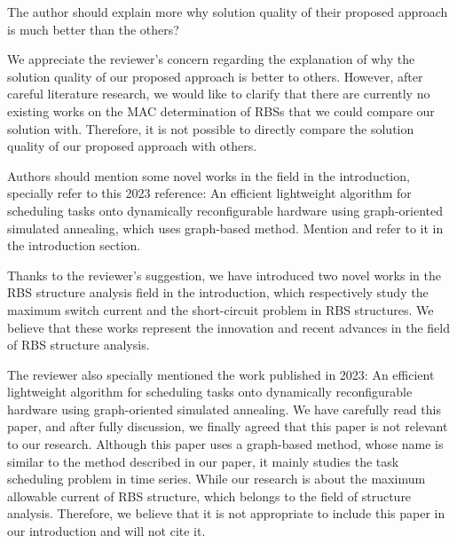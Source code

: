 \begin{revcomment}
  The author should explain more why solution quality of their proposed approach is much better than the others?
\end{revcomment}
\begin{revresponse}

We appreciate the reviewer's concern regarding the explanation of why the solution quality of our proposed approach is better to others. 
However, after careful literature research, we would like to clarify that there are currently no existing works on the MAC determination of RBSs that we could compare our solution with. 
Therefore, it is not possible to directly compare the solution quality of our proposed approach with others.
  
\end{revresponse}

\begin{revcomment}
  Authors should mention some novel works in the field in the introduction, specially refer to this 2023 reference: An efficient lightweight algorithm for scheduling tasks onto dynamically reconfigurable hardware using graph-oriented simulated annealing, which uses graph-based method. Mention and refer to it in the introduction section.
\end{revcomment}
\begin{revresponse}

Thanks to the reviewer's suggestion, we have introduced two novel works in the RBS structure analysis field in the introduction, which respectively study the maximum switch current \cite{han2021analysis} and the short-circuit problem \cite{chenSneakCircuitTheory2021} in RBS structures.
We believe that these works represent the innovation and recent advances in the field of RBS structure analysis.


The reviewer also specially mentioned the work published in 2023: An efficient lightweight algorithm for scheduling tasks onto dynamically reconfigurable hardware using graph-oriented simulated annealing.
We have carefully read this paper, and after fully discussion, we finally agreed that this paper is not relevant to our research.
Although this paper uses a graph-based method, whose name is similar to the method described in our paper, it mainly studies the task scheduling problem in time series.
While our research is about the maximum allowable current of RBS structure, which belongs to the field of structure analysis.
Therefore, we believe that it is not appropriate to include this paper in our introduction and will not cite it.
  
\end{revresponse}

